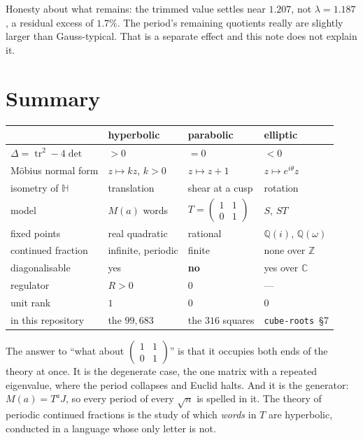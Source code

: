 \documentclass[12pt,a4paper]{article}
\theoremstyle{plain}
\theoremstyle{definition}
\newcommand{\tr}{\operatorname{tr}}
\newcommand{\Mat}[4]{\begin{pmatrix} #1 & #2 \\ #3 & #4\end{pmatrix}}
\newcommand{\T}{\Mat{1}{1}{0}{1}}
\begin{document}
Honesty about what remains: the trimmed value settles near $1.207$, not $\lambda = 1.187$, a residual excess of $1.7\%$. The period's remaining quotients really are slightly larger than Gauss-typical. That is a separate effect and this note does not explain it.

\section{Summary}

\begin{center}
\begin{tabular}{llll}
\toprule
 & hyperbolic & parabolic & elliptic \\
\midrule
$\Delta = \tr^2-4\det$ & $>0$ & $=0$ & $<0$ \\
M\"obius normal form   & $z\mapsto kz$, $k>0$ & $z \mapsto z+1$ & $z \mapsto e^{i\theta}z$ \\
isometry of $\mathbb{H}$ & translation & shear at a cusp & rotation \\
model                  & $M(a)$ words & $T=\T$ & $S$, $ST$ \\
fixed points           & real quadratic & rational & $\mathbb{Q}(i)$, $\mathbb{Q}(\omega)$ \\
continued fraction     & infinite, periodic & finite & none over $\mathbb{Z}$ \\
diagonalisable         & yes & \textbf{no} & yes over $\mathbb{C}$ \\
regulator              & $R>0$ & $0$ & --- \\
unit rank              & $1$ & $0$ & $0$ \\
in this repository     & the $99{,}683$ & the $316$ squares & \texttt{cube-roots}~\S7 \\
\bottomrule
\end{tabular}
\end{center}

The answer to ``what about $\T$'' is that it occupies both ends of the theory at once. It is the degenerate case, the one matrix with a repeated eigenvalue, where the period collapses and Euclid halts. And it is the generator: $M(a) = T^aJ$, so every period of every $\sqrt n$ is spelled in it. The theory of periodic continued fractions is the study of which \emph{words} in $T$ are hyperbolic, conducted in a language whose only letter is not.
\end{document}
